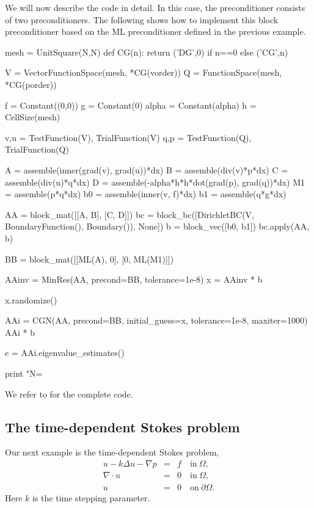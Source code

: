 We will now describe the code in detail.  In this case, the
preconditioner consists of two preconditioners.  The following shows
how to implement this block preconditioner
based on the ML preconditioner defined in the previous example.
\begin{python}
mesh = UnitSquare(N,N)
def CG(n):
    return ('DG',0) if n==0 else ('CG',n)

V = VectorFunctionSpace(mesh, *CG(vorder))
Q = FunctionSpace(mesh, *CG(porder))

f = Constant((0,0))
g = Constant(0)
alpha = Constant(alpha)
h = CellSize(mesh)

v,u = TestFunction(V), TrialFunction(V)
q,p = TestFunction(Q), TrialFunction(Q)

A  = assemble(inner(grad(v), grad(u))*dx)
B  = assemble(div(v)*p*dx)
C  = assemble(div(u)*q*dx)
D  = assemble(-alpha*h*h*dot(grad(p), grad(q))*dx)
M1 = assemble(p*q*dx)
b0 = assemble(inner(v, f)*dx)
b1 = assemble(q*g*dx)

AA = block_mat([[A, B],
                [C, D]])
bc = block_bc([DirichletBC(V, BoundaryFunction(), Boundary()), None])
b = block_vec([b0, b1])
bc.apply(AA, b)

BB = block_mat([[ML(A),  0],
                [0, ML(M1)]])


AAinv = MinRes(AA, precond=BB, tolerance=1e-8)
x = AAinv * b

x.randomize()

AAi = CGN(AA, precond=BB, initial_guess=x, tolerance=1e-8, maxiter=1000)
AAi * b

e = AAi.eigenvalue_estimates()

print "N=%
\end{python}
We refer to  for the complete code.

\subsection{The time-dependent Stokes problem}
Our next example is the time-dependent Stokes problem,
\begin{eqnarray}
u - k \Delta u - \nabla p &=& f \quad \mbox{in} \ \Omega, \\
\nabla \cdot u &=& 0 \quad \mbox{in} \  \Omega, \\
             u &=& 0   \quad \mbox{on} \  \partial \Omega.
\end{eqnarray}
Here $k$ is the time stepping parameter.

